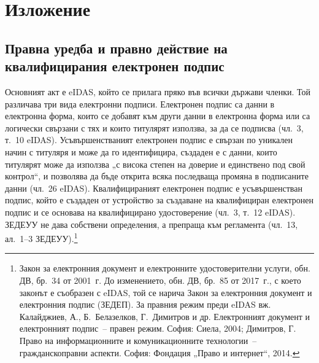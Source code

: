 \section{Изложение}
\label{sec:izlozhenie}

\subsection{Правна уредба и правно действие на квалифицирания електронен подпис}
\label{sec:uredba}

Основният акт е eIDAS, който се прилага пряко във всички държави членки. Той различава три
вида електронни подписи. Електронен подпис са данни в електронна форма, които се добавят
към други данни в електронна форма или са логически свързани с тях и които титулярят
използва, за да се подписва (чл.~3, т.~10 eIDAS). Усъвършенстваният електронен подпис е
свързан по уникален начин с титуляря и може да го идентифицира, създаден е с данни, които
титулярят може да използва „с висока степен на доверие и единствено под свой контрол“, и
позволява да бъде открита всяка последваща промяна в подписаните данни (чл.~26 eIDAS).
Квалифицираният електронен подпис е усъвършенстван подпис, който е създаден от устройство
за създаване на квалифициран електронен подпис и се основава на квалифицирано
удостоверение (чл.~3, т.~12 eIDAS). ЗЕДЕУУ не дава собствени определения, а препраща към
регламента (чл.~13, ал.~1--3 ЗЕДЕУУ).\footnote{Закон за електронния документ и
електронните удостоверителни услуги, обн. ДВ, бр.~34 от 2001~г. До изменението, обн. ДВ,
бр.~85 от 2017~г., с което законът е съобразен с eIDAS, той се нарича Закон за
електронния документ и електронния подпис (ЗЕДЕП). За правния режим преди eIDAS вж.
Калайджиев, А., Б.~Белазелков, Г.~Димитров и др. Електронният документ и електронният
подпис~-- правен режим. София: Сиела, 2004; Димитров, Г. Право на информационните и
комуникационните технологии~-- гражданскоправни аспекти. София: Фондация „Право и
интернет“, 2014.}

